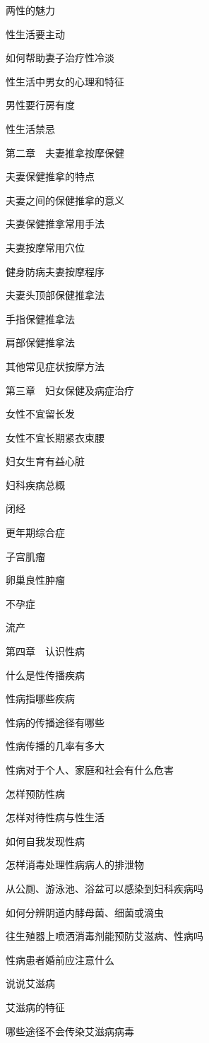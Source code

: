 \documentclass[12pt,UTF8]{ctexbook}
\begin{document}
两性的魅力

性生活要主动

如何帮助妻子治疗性冷淡

性生活中男女的心理和特征

男性要行房有度

性生活禁忌

第二章　夫妻推拿按摩保健

夫妻保健推拿的特点

夫妻之间的保健推拿的意义

夫妻保健推拿常用手法

夫妻按摩常用穴位

健身防病夫妻按摩程序

夫妻头顶部保健推拿法

手指保健推拿法

肩部保健推拿法

其他常见症状按摩方法

第三章　妇女保健及病症治疗

女性不宜留长发

女性不宜长期紧衣束腰

妇女生育有益心脏

妇科疾病总概

闭经

更年期综合症

子宫肌瘤

卵巢良性肿瘤

不孕症

流产

第四章　认识性病

什么是性传播疾病

性病指哪些疾病

性病的传播途径有哪些

性病传播的几率有多大

性病对于个人、家庭和社会有什么危害

怎样预防性病

怎样对待性病与性生活

如何自我发现性病

怎样消毒处理性病病人的排泄物

从公厕、游泳池、浴盆可以感染到妇科疾病吗

如何分辨阴道内酵母菌、细菌或滴虫

往生殖器上喷洒消毒剂能预防艾滋病、性病吗

性病患者婚前应注意什么

说说艾滋病

艾滋病的特征

哪些途径不会传染艾滋病病毒
\end{document}
